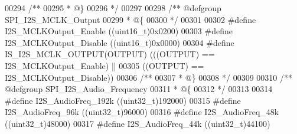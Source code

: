 \begin{DoxyCode}
00294 \textcolor{comment}{/**}
00295 \textcolor{comment}{  * @\}}
00296 \textcolor{comment}{  */}
00297 
00298 \textcolor{comment}{/** @defgroup SPI\_I2S\_MCLK\_Output }
00299 \textcolor{comment}{  * @\{}
00300 \textcolor{comment}{  */}
00301 
00302 \textcolor{preprocessor}{#}\textcolor{preprocessor}{define} \textcolor{preprocessor}{I2S\_MCLKOutput\_Enable}           \textcolor{preprocessor}{(}\textcolor{preprocessor}{(}\textcolor{preprocessor}{uint16\_t}\textcolor{preprocessor}{)}0x0200\textcolor{preprocessor}{)}
00303 \textcolor{preprocessor}{#}\textcolor{preprocessor}{define} \textcolor{preprocessor}{I2S\_MCLKOutput\_Disable}          \textcolor{preprocessor}{(}\textcolor{preprocessor}{(}\textcolor{preprocessor}{uint16\_t}\textcolor{preprocessor}{)}0x0000\textcolor{preprocessor}{)}
00304 \textcolor{preprocessor}{#}\textcolor{preprocessor}{define} \textcolor{preprocessor}{IS\_I2S\_MCLK\_OUTPUT}\textcolor{preprocessor}{(}\textcolor{preprocessor}{OUTPUT}\textcolor{preprocessor}{)} \textcolor{preprocessor}{(}\textcolor{preprocessor}{(}\textcolor{preprocessor}{(}\textcolor{preprocessor}{OUTPUT}\textcolor{preprocessor}{)} \textcolor{preprocessor}{==} I2S_MCLKOutput_Enable\textcolor{preprocessor}{)} \textcolor{preprocessor}{||}
00305                                     \textcolor{preprocessor}{(}\textcolor{preprocessor}{(}\textcolor{preprocessor}{OUTPUT}\textcolor{preprocessor}{)} \textcolor{preprocessor}{==} I2S_MCLKOutput_Disable\textcolor{preprocessor}{)}\textcolor{preprocessor}{)}
00306 \textcolor{comment}{/**}
00307 \textcolor{comment}{  * @\}}
00308 \textcolor{comment}{  */}
00309 
00310 \textcolor{comment}{/** @defgroup SPI\_I2S\_Audio\_Frequency }
00311 \textcolor{comment}{  * @\{}
00312 \textcolor{comment}{  */}
00313 
00314 \textcolor{preprocessor}{#}\textcolor{preprocessor}{define} \textcolor{preprocessor}{I2S\_AudioFreq\_192k}               \textcolor{preprocessor}{(}\textcolor{preprocessor}{(}\textcolor{preprocessor}{uint32\_t}\textcolor{preprocessor}{)}192000\textcolor{preprocessor}{)}
00315 \textcolor{preprocessor}{#}\textcolor{preprocessor}{define} \textcolor{preprocessor}{I2S\_AudioFreq\_96k}                \textcolor{preprocessor}{(}\textcolor{preprocessor}{(}\textcolor{preprocessor}{uint32\_t}\textcolor{preprocessor}{)}96000\textcolor{preprocessor}{)}
00316 \textcolor{preprocessor}{#}\textcolor{preprocessor}{define} \textcolor{preprocessor}{I2S\_AudioFreq\_48k}                \textcolor{preprocessor}{(}\textcolor{preprocessor}{(}\textcolor{preprocessor}{uint32\_t}\textcolor{preprocessor}{)}48000\textcolor{preprocessor}{)}
00317 \textcolor{preprocessor}{#}\textcolor{preprocessor}{define} \textcolor{preprocessor}{I2S\_AudioFreq\_44k}                \textcolor{preprocessor}{(}\textcolor{preprocessor}{(}\textcolor{preprocessor}{uint32\_t}\textcolor{preprocessor}{)}44100\textcolor{preprocessor}{)}

\end{DoxyCode}
